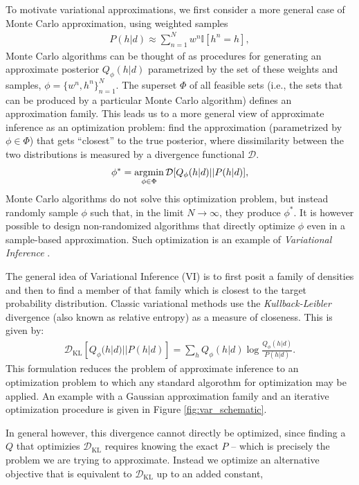 To motivate variational approximations, we first consider a more general case of Monte Carlo approximation, using weighted samples
\begin{align}
    P(h|d) \approx \sum_{n=1}^N w^n \mathbb{I}[h^n = h],
    \label{eq:montecarlo}
\end{align}
Monte Carlo algorithms can be thought of as procedures for generating an approximate posterior $Q_\phi(h|d)$ parametrized by the set of these weights and samples, $\phi = \{ w^n, h^n \}_{n=1}^N$. The superset $\Phi$ of all feasible sets (i.e., the sets that can be produced by a particular Monte Carlo algorithm) defines an approximation family. This leads us to a more general view of approximate inference as an optimization problem: find the approximation (parametrized by $\phi \in \Phi$) that gets ``closest'' to the true posterior, where dissimilarity between the two distributions is measured by a divergence functional $\mathcal{D}$. 
\begin{align}
\phi^\ast = \operatorname*{argmin}_{\phi \in \Phi} \mathcal{D}[Q_\phi(h|d)||P(h|d)],
\end{align}
Monte Carlo algorithms do not solve this optimization problem, but instead randomly sample $\phi$ such that, in the limit $N \rightarrow \infty$, they produce $\phi^\ast$. It is however possible to design non-randomized algorithms that directly optimize $\phi$ even in a sample-based approximation\citep{saeedi2017variational}. Such optimization is an example of \emph{Variational Inference} \citep{jordan1999introduction}.

The general idea of Variational Inference (VI) is to first posit a family of densities and then to find a member of that family which is closest to the target probability distribution. Classic variational methods use the \textit{Kullback-Leibler} divergence (also known as relative entropy) as a measure of closeness. This is given by:
\begin{align}
\mathcal{D}_{\text{KL}}[Q_\phi(h|d)||P(h|d)] = \sum_h Q_\phi(h|d) \log \frac{Q_\phi(h|d)}{P(h|d)}.
\end{align}
This formulation reduces the problem of approximate inference to an optimization problem to which any standard algorothm for optimization may be applied. An example with a Gaussian approximation family and an iterative optimization procedure is given in Figure \ref{fig:var_schematic}.

In general however, this divergence cannot directly be optimized, since finding a $Q$ that optimizies $\mathcal{D}_{\text{KL}}$ requires knowing the exact $P$ -- which is precisely the problem we are trying to approximate. Instead we optimize an alternative objective that is equivalent to $\mathcal{D}_{\text{KL}}$ up to an added constant,


